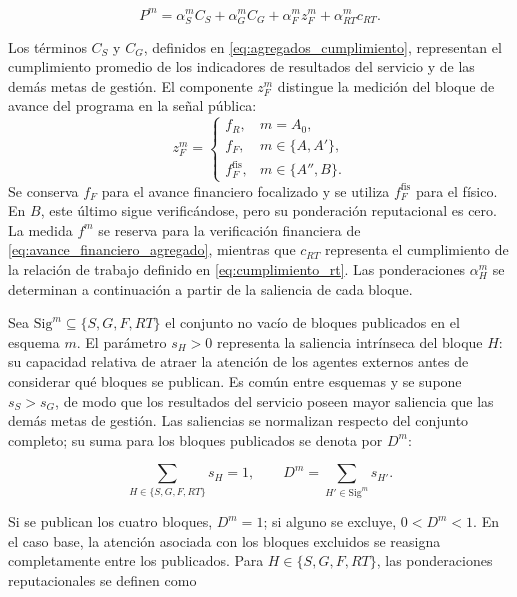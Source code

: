 \begin{equation}
\label{eq:desempeno_percibido}
P^m
=
\alpha_S^m C_S
+
\alpha_G^m C_G
+
\alpha_F^m z_F^m
+
\alpha_{RT}^m c_{RT}.
\end{equation}

Los términos \(C_S\) y \(C_G\), definidos en \eqref{eq:agregados_cumplimiento}, representan el cumplimiento promedio de los indicadores de resultados del servicio y de las demás metas de gestión. El componente \(z_F^m\) distingue la medición del bloque de avance del programa en la señal pública:
\begin{equation}
\label{eq:componente_focalizado_senal}
z_F^m=
\begin{cases}
f_R, & m=A_0,\\
f_F, & m\in\{A,A'\},\\
f_F^{\mathrm{fis}}, & m\in\{A'',B\}.
\end{cases}
\end{equation}
Se conserva \(f_F\) para el avance financiero focalizado y se utiliza \(f_F^{\mathrm{fis}}\) para el físico. En \(B\), este último sigue verificándose, pero su ponderación reputacional es cero. La medida \(f^m\) se reserva para la verificación financiera de \eqref{eq:avance_financiero_agregado}, mientras que \(c_{RT}\) representa el cumplimiento de la relación de trabajo definido en \eqref{eq:cumplimiento_rt}. Las ponderaciones \(\alpha_H^m\) se determinan a continuación a partir de la saliencia de cada bloque.

Sea \(\mathrm{Sig}^m\subseteq\{S,G,F,RT\}\) el conjunto no vacío de bloques publicados en el esquema \(m\). El parámetro \(s_H>0\) representa la saliencia intrínseca del bloque \(H\): su capacidad relativa de atraer la atención de los agentes externos antes de considerar qué bloques se publican. Es común entre esquemas y se supone \(s_S>s_G\), de modo que los resultados del servicio poseen mayor saliencia que las demás metas de gestión. Las saliencias se normalizan respecto del conjunto completo; su suma para los bloques publicados se denota por \(D^m\):

\begin{equation}
\label{eq:normalizacion_saliencias}
\sum_{H\in\{S,G,F,RT\}}s_H=1,
\qquad
D^m=\sum_{H'\in\mathrm{Sig}^m}s_{H'}.
\end{equation}

Si se publican los cuatro bloques, \(D^m=1\); si alguno se excluye, \(0<D^m<1\). En el caso base, la atención asociada con los bloques excluidos se reasigna completamente entre los publicados. Para \(H\in\{S,G,F,RT\}\), las ponderaciones reputacionales se definen como


